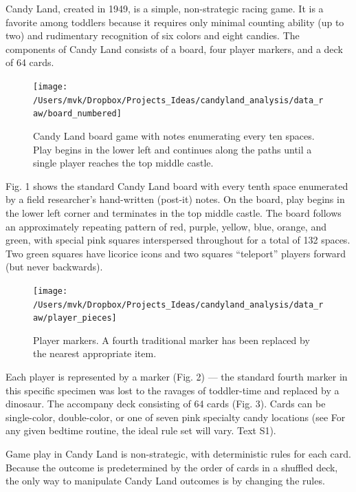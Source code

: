 \documentclass[letterpaper,9pt,twocolumn,twoside,]{pinp}
\begin{document}
Candy Land, created in 1949, is a simple, non-strategic racing game. It
is a favorite among toddlers because it requires only minimal counting
ability (up to two) and rudimentary recognition of six colors and eight
candies. The components of Candy Land consists of a board, four player
markers, and a deck of 64 cards.

\begin{figure}

{\centering \texttt{[image: /Users/mvk/Dropbox/Projects\_Ideas/candyland\_analysis/data\_raw/board\_numbered]} 

}

\caption{Candy Land board game with notes enumerating every ten spaces. Play begins in the lower left and continues along the paths until a single player reaches the top middle castle.}\label{fig:unnamed-chunk-3}
\end{figure}

Fig. 1 shows the standard Candy Land board with every tenth space
enumerated by a field researcher's hand-written (post-it) notes. On the
board, play begins in the lower left corner and terminates in the top
middle castle. The board follows an approximately repeating pattern of
red, purple, yellow, blue, orange, and green, with special pink squares
interspersed throughout for a total of 132 spaces. Two green squares
have licorice icons and two squares ``teleport'' players forward (but
never backwards).

\begin{figure}

{\centering \texttt{[image: /Users/mvk/Dropbox/Projects\_Ideas/candyland\_analysis/data\_raw/player\_pieces]} 

}

\caption{Player markers. A fourth traditional marker has been replaced by the nearest appropriate item.}\label{fig:unnamed-chunk-4}
\end{figure}

Each player is represented by a marker (Fig. 2) --- the standard fourth
marker in this specific specimen was lost to the ravages of toddler-time
and replaced by a dinosaur. The accompany deck consisting of 64 cards
(Fig. 3). Cards can be single-color, double-color, or one of seven pink
specialty candy locations (see For any given bedtime routine, the ideal
rule set will vary. Text S1).

Game play in Candy Land is non-strategic, with deterministic rules for
each card. Because the outcome is predetermined by the order of cards in
a shuffled deck, the only way to manipulate Candy Land outcomes is by
changing the rules.
\end{document}
